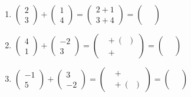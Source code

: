 \begin{enumerate}[label=\arabic*.]
    \begin{enumerate}[label=\alph*)]
        \item $\begin{pmatrix} 2 \\ 3 \end{pmatrix} + \begin{pmatrix} 1 \\ 4 \end{pmatrix} = \begin{pmatrix} 2+1 \\ 3+4 \end{pmatrix} = \begin{pmatrix} \phantom{0} \\ \phantom{0} \end{pmatrix}$
        \vspace{0.5cm}

        \item $\begin{pmatrix} 4 \\ 1 \end{pmatrix} + \begin{pmatrix} -2 \\ 3 \end{pmatrix} = \begin{pmatrix} \phantom{0}+(\phantom{0}) \\ \phantom{0}+\phantom{0} \end{pmatrix} = \begin{pmatrix} \phantom{0} \\ \phantom{0} \end{pmatrix}$
        \vspace{0.5cm}

        \item $\begin{pmatrix} -1 \\ 5 \end{pmatrix} + \begin{pmatrix} 3 \\ -2 \end{pmatrix} = \begin{pmatrix} \phantom{0}+\phantom{0} \\ \phantom{0}+(\phantom{0}) \end{pmatrix} = \begin{pmatrix} \phantom{0} \\ \phantom{0} \end{pmatrix}$
    \end{enumerate}


\end{enumerate}
